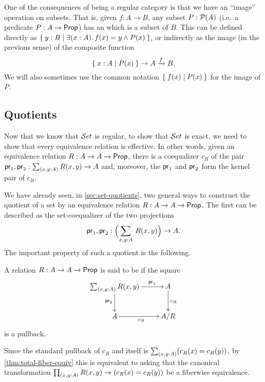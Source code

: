 One of the consequences of \uset being a regular category is that we have an ``image'' operation on subsets.
That is, given $f:A\to B$, any subset $P:\mathcal{P}(A)$ (i.e.\ a predicate $P:A\to \mathsf{Prop}$) has an  which is a subset of $B$.
This can be defined directly as $\setof{ y:B | \exis{x:A} f(x)=y \land P(x)}$, or indirectly as the image (in the previous sense) of the composite function
\[ \Set{ x:A | P(x) } \to A \xrightarrow{f} B.\]
We will also sometimes use the common notation $\Set{f(x) | P(x)}$ for the image of $P$.


\subsection{Quotients}\label{subsec:quotients}

%
Now that we know that $\mathcal{S}et$ is regular, to show that $\mathcal{S}et$ is exact, we need to show that every
equivalence relation is effective.
%
%
In other words, given an equivalence
relation $R:A\to A\to\mathsf{Prop}$, there is a coequalizer $c_R$ of the pair
$\proj1,\proj2:\sm{x,y:A} R(x,y)\to A$ and, moreover, the $\mathsf{pr}_{1}$ and $\mathsf{pr}_{2}$
form the kernel pair of $c_R$.

We have already seen, in \cref{sec:set-quotients}, two general ways to construct the quotient of a set by an equivalence relation $R:A\to A\to\mathsf{Prop}$.
The first can be described as the set-coequalizer of the two projections
\[\proj1,\proj2:\Parens{\sm{x,y:A} R(x,y)} \to A.\]
The important property of such a quotient is the following.

\begin{defn}
  A relation $R:A\to A\to\mathsf{Prop}$ is said to be 
  if the square
\begin{equation*}
  \xymatrix{
    {\sm{x,y:A} R (x,y)}
    \ar[r]^(0.7){\proj1}
    \ar[d]_{\proj2}
    &
    {A}
    \ar[d]^{c_R}
    \\
    {A}
    \ar[r]_{c_R}
    &
    {A/R}
    }
\end{equation*}
is a pullback.
\end{defn}

Since the standard pullback of $c_R$ and itself is $\sm{x,y:A} (c_R(x)=c_R(y))$, by \cref{thm:total-fiber-equiv} this is equivalent to asking that the canonical transformation $\prd{x,y:A} R(x,y) \to (c_R(x)=c_R(y))$ be a fiberwise equivalence.

